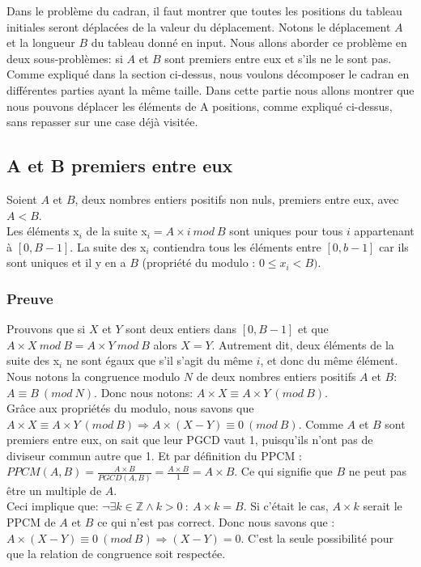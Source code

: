 Dans le problème du cadran, il faut montrer que toutes les positions du tableau initiales seront déplacées de la valeur du déplacement. Notons le déplacement $A$ et la longueur $B$ du tableau donné en input. Nous allons aborder ce problème en deux sous-problèmes: si $A$ et $B$ sont premiers entre eux et s'ils ne le sont pas.\\  

Comme expliqué dans la section ci-dessus, nous voulons décomposer le cadran en différentes parties ayant la même taille. Dans cette partie nous allons montrer que nous pouvons déplacer les éléments de A positions, comme expliqué ci-dessus, sans repasser sur une case déjà visitée. \\

\subsection{A et B premiers entre eux}
Soient $A$ et $B$, deux nombres entiers positifs non nuls, premiers entre eux, avec $A < B$.\\
Les éléments x$_{i}$ de la suite x$_{i} = A \times i\ mod\ B$ sont uniques pour tous $i$ appartenant à $[0, B-1]$.
La suite des x$_{i}$ contiendra tous les éléments entre $[0, b-1]$ car ils sont uniques et il y en a $B$ (propriété du modulo : $0\leq x_i < B)$.

\subsubsection* {Preuve}
Prouvons que si $X$ et $Y$ sont deux entiers dans $[0, B-1]$ et que $A\times X\ mod\ B = A\times Y\ mod\ B$ alors $X = Y$. Autrement dit, deux éléments de la suite des x$_{i}$ ne sont égaux que s'il s'agit du même $i$, et donc du même élément. Nous notons la congruence modulo $N$ de deux nombres entiers positifs $A$ et $B$: $A \equiv B\ (mod\ N)$. Donc nous notons: $A\times X ≡ A\times Y\ (mod\ B)$.\\

Grâce aux propriétés du modulo, nous savons que $A\times X ≡ A\times Y\ (mod\ B) \Rightarrow A\times (X-Y) ≡ 0\ (mod\ B).$ Comme $A$ et $B$ sont premiers entre eux, on sait que leur PGCD vaut 1, puisqu'ils n'ont pas de diviseur commun autre que 1. Et par définition du PPCM : $PPCM(A,B) = \frac{A\times B}{PGCD(A,B)} = \frac{A\times B} {1} = A\times B$. Ce qui signifie que $B$ ne peut pas être un multiple de $A$.\\

Ceci implique que: $\neg  \exists k \in \mathbb{Z} \wedge k>0\ :\ A\times k = B$. Si c'était le cas, $A\times k$ serait le PPCM de $A$ et $B$ ce qui n'est pas correct. Donc nous savons que : $A\times (X-Y) ≡ 0\ (mod\ B) \Rightarrow (X-Y) = 0$. C'est la seule possibilité pour que la relation de congruence soit respectée.\\


